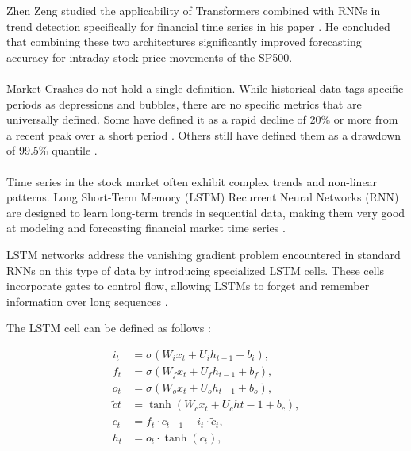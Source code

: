 \documentclass[12pt, letterpaper]{article}
\begin{document}
    Zhen Zeng studied the applicability of Transformers combined with RNNs in trend detection specifically for financial time series in his paper \cite{zeng2023financial}. He concluded that combining these two architectures significantly improved forecasting accuracy for intraday stock price movements of the SP500.
    \paragraph*{}
    Market Crashes do not hold a single definition. While historical data tags specific periods as depressions and bubbles, there are no specific metrics that are universally defined. Some have defined it as a rapid decline of 20\% or more from a recent peak over a short period \cite{Fonville, Investo}. Others still have defined them as a drawdown of 99.5\% quantile \cite{99.5quantile}.
    \paragraph*{}
    
    Time series in the stock market often exhibit complex trends and non-linear patterns. 
    Long Short-Term Memory (LSTM) Recurrent Neural Networks (RNN) are designed to learn long-term trends in sequential data, making them very good at modeling and forecasting financial market time series \cite{hochreiter1997, greff2017}.

    LSTM networks address the vanishing gradient problem encountered in standard RNNs on this type of data by introducing specialized LSTM cells. These cells incorporate gates to control flow, allowing LSTMs to forget and remember information over long sequences \cite{hochreiter1997}.

    The LSTM cell can be defined as follows \cite{hochreiter1997}:

\begin{align*} 
    i_t &= \sigma(W_i x_t + U_i h_{t-1} + b_i), \\ f_t &= \sigma(W_f x_t + U_f h_{t-1} + b_f), \\ o_t &= \sigma(W_o x_t + U_o h_{t-1} + b_o), \\ \tilde{c}t &= \tanh(W_c x_t + U_c h{t-1} + b_c), \\ c_t &= f_t \cdot c_{t-1} + i_t \cdot \tilde{c}_t, \\ h_t &= o_t \cdot \tanh(c_t), 
\end{align*}
\end{document}
